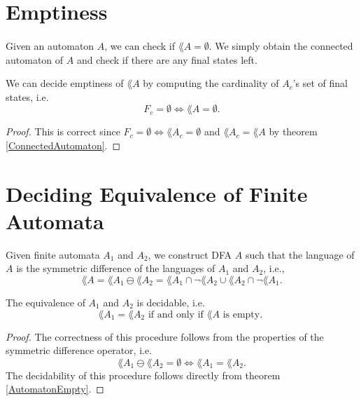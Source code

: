 
\section{Emptiness}
\paragraph{}
Given an automaton $A$, we can check if $\lang{A} = \emptyset$. We simply obtain the connected automaton of $A$ and check if there are any final states left. 
\begin{theorem} We can decide emptiness of $\lang{A}$ by computing the cardinality of $A_c$'s set of final states, i.e.
    \label{AutomatonEmpty}
    \[        F_c = \emptyset \Longleftrightarrow \lang{A} = \emptyset.       \]
\end{theorem}

\begin{proof}
    This is correct since $F_c = \emptyset \Leftrightarrow \lang{A_c} = \emptyset$ and $\lang{A_c} = \lang{A}$ by theorem \ref{ConnectedAutomaton}.
\end{proof}


\section{Deciding Equivalence of Finite Automata}
Given finite automata $A_1$ and $A_2$, we construct DFA $A$ such that the language of $A$ is the symmetric difference of the languages of $A_1$ and $A_2$, i.e.,
\[          \lang{A} = \lang{A_1} \ominus \lang{A_2} = \lang{A_1} \cap \neg \lang{A_2} \cup \lang{A_2} \cap \neg \lang{A_1}.      \]
\begin{theorem} The equivalence of $A_1$ and $A_2$ is decidable, i.e.
    \[                \lang{A_1} = \lang{A_2} \mbox{ if and only if } \lang{A} \mbox{ is empty. }                \]
\end{theorem}
\begin{proof}
    The correctness of this procedure follows from the properties of the symmetric difference operator, i.e.
    \[                  \lang{A_1} \ominus \lang{A_2} = \emptyset \Leftrightarrow \lang{A_1} = \lang{A_2}.                  \]
    The decidability of this procedure follows directly from theorem \ref{AutomatonEmpty}.
\end{proof}



